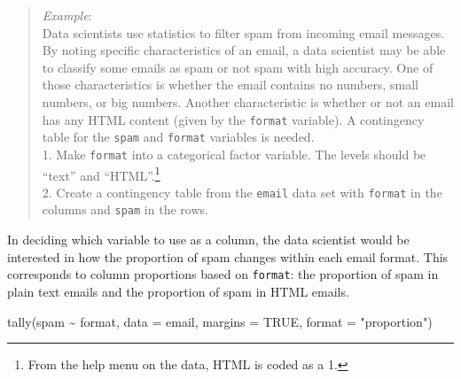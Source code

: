 \documentclass[
  letterpaper,
  DIV=11,
  numbers=noendperiod]{scrreprt}
\newenvironment{Shaded}{\begin{snugshade}}{\end{snugshade}}
\newcommand{\AttributeTok}[1]{\textcolor[rgb]{0.40,0.45,0.13}{#1}}
\newcommand{\ConstantTok}[1]{\textcolor[rgb]{0.56,0.35,0.01}{#1}}
\newcommand{\DecValTok}[1]{\textcolor[rgb]{0.68,0.00,0.00}{#1}}
\newcommand{\FunctionTok}[1]{\textcolor[rgb]{0.28,0.35,0.67}{#1}}
\newcommand{\NormalTok}[1]{\textcolor[rgb]{0.00,0.23,0.31}{#1}}
\newcommand{\OtherTok}[1]{\textcolor[rgb]{0.00,0.23,0.31}{#1}}
\newcommand{\SpecialCharTok}[1]{\textcolor[rgb]{0.37,0.37,0.37}{#1}}
\newcommand{\StringTok}[1]{\textcolor[rgb]{0.13,0.47,0.30}{#1}}
\begin{document}
\begin{quote}
\emph{Example}:\\
Data scientists use statistics to filter spam from incoming email
messages. By noting specific characteristics of an email, a data
scientist may be able to classify some emails as spam or not spam with
high accuracy. One of those characteristics is whether the email
contains no numbers, small numbers, or big numbers. Another
characteristic is whether or not an email has any HTML content (given by
the \texttt{format} variable). A contingency table for the \texttt{spam}
and \texttt{format} variables is needed.\\
1. Make \texttt{format} into a categorical factor variable. The levels
should be ``text'' and ``HTML''.\footnote{From the help menu on the
  data, HTML is coded as a 1.}\\
2. Create a contingency table from the \texttt{email} data set with
\texttt{format} in the columns and \texttt{spam} in the rows.
\end{quote}

\begin{Shaded}
\end{Shaded}

In deciding which variable to use as a column, the data scientist would
be interested in how the proportion of spam changes within each email
format. This corresponds to column proportions based on \texttt{format}:
the proportion of spam in plain text emails and the proportion of spam
in HTML emails.

\begin{Shaded}
\begin{Highlighting}[]
\FunctionTok{tally}\NormalTok{(spam }\SpecialCharTok{\textasciitilde{}}\NormalTok{ format, }\AttributeTok{data =}\NormalTok{ email, }\AttributeTok{margins =} \ConstantTok{TRUE}\NormalTok{, }\AttributeTok{format =} \StringTok{"proportion"}\NormalTok{)}
\end{Highlighting}
\end{Shaded}
\end{document}
